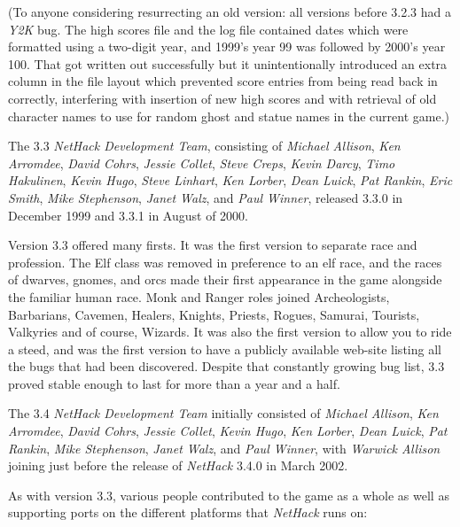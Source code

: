 \documentclass[titlepage]{article}
\begin{document}
(To anyone considering resurrecting an old version:  all versions before
3.2.3 had a \textit{Y2K} bug.
The high scores file and the log file contained
dates which were formatted using a two-digit year, and 1999's year 99 was
followed by 2000's year 100.
That got written out successfully but it
unintentionally introduced an extra column in the file layout which prevented
score entries from being read back in correctly, interfering with insertion
of new high scores and with retrieval of old character names to use for
random ghost and statue names in the current game.)

\medskip
The 3.3 \textit{NetHack Development Team}, consisting of \textit{Michael Allison}, \textit{Ken Arromdee},
\textit{David Cohrs}, \textit{Jessie Collet}, \textit{Steve Creps}, \textit{Kevin Darcy},
\textit{Timo Hakulinen}, \textit{Kevin Hugo}, \textit{Steve Linhart}, \textit{Ken Lorber},
\textit{Dean Luick}, \textit{Pat Rankin}, \textit{Eric Smith}, \textit{Mike Stephenson},
\textit{Janet Walz}, and \textit{Paul Winner}, released 3.3.0 in
December 1999 and 3.3.1 in August of 2000.

\medskip
Version 3.3 offered many firsts. It was the first version to separate race
and profession. The Elf class was removed in preference to an elf race,
and the races of dwarves, gnomes, and orcs made their first appearance in
the game alongside the familiar human race.  Monk and Ranger roles joined
Archeologists, Barbarians, Cavemen, Healers, Knights, Priests, Rogues, Samurai,
Tourists, Valkyries and of course, Wizards.  It was also the first version
to allow you to ride a steed, and was the first version to have a publicly
available web-site listing all the bugs that had been discovered.  Despite
that constantly growing bug list, 3.3 proved stable enough to last for
more than a year and a half.

\medskip
The 3.4 \textit{NetHack Development Team} initially consisted of
\textit{Michael Allison}, \textit{Ken Arromdee},
\textit{David Cohrs}, \textit{Jessie Collet}, \textit{Kevin Hugo}, \textit{Ken Lorber},
\textit{Dean Luick}, \textit{Pat Rankin}, \textit{Mike Stephenson},
\textit{Janet Walz}, and \textit{Paul Winner}, with \textit{ Warwick Allison} joining
just before the release of \textit{NetHack} 3.4.0 in March 2002.

\medskip
As with version 3.3, various people contributed to the game as a whole as
well as supporting ports on the different platforms that \textit{NetHack}
runs on:
\end{document}
